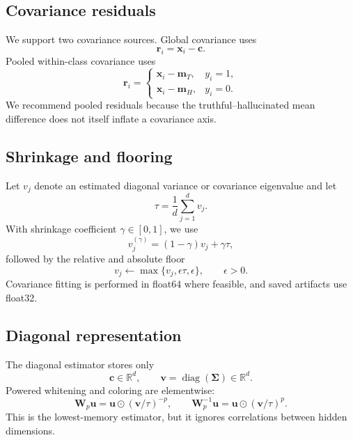 \documentclass[11pt]{article}
\newcommand{\R}{\mathbb{R}}
\begin{document}
\subsection{Covariance residuals}

We support two covariance sources.  Global covariance uses
\begin{equation}
  \bm r_i=\bm x_i-\bm c.
\end{equation}
Pooled within-class covariance uses
\begin{equation}
  \bm r_i =
  \begin{cases}
    \bm x_i-\bm m_T,&y_i=1,\\
    \bm x_i-\bm m_H,&y_i=0.
  \end{cases}
\end{equation}
We recommend pooled residuals because the truthful--hallucinated mean
difference does not itself inflate a covariance axis.

\subsection{Shrinkage and flooring}

Let $v_j$ denote an estimated diagonal variance or covariance eigenvalue and
let
\begin{equation}
  \tau=\frac{1}{d}\sum_{j=1}^{d}v_j.
\end{equation}
With shrinkage coefficient $\gamma\in[0,1]$, we use
\begin{equation}
  v_j^{(\gamma)}=(1-\gamma)v_j+\gamma\tau,
\end{equation}
followed by the relative and absolute floor
\begin{equation}
  v_j\leftarrow\max\{v_j,\epsilon\tau,\epsilon\},
  \qquad \epsilon>0.
\end{equation}
Covariance fitting is performed in float64 where feasible, and saved artifacts
use float32.

\subsection{Diagonal representation}

The diagonal estimator stores only
\begin{equation}
  \bm c\in\R^d,
  \qquad \bm v=\operatorname{diag}(\bm\Sigma)\in\R^d.
\end{equation}
Powered whitening and coloring are elementwise:
\begin{equation}
  \bm W_p\bm u=\bm u\odot(\bm v/\tau)^{-p},
  \qquad
  \bm W_p^{-1}\bm u=\bm u\odot(\bm v/\tau)^p.
\end{equation}
This is the lowest-memory estimator, but it ignores correlations between hidden
dimensions.
\end{document}
